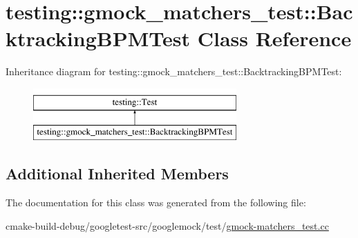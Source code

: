 \hypertarget{classtesting_1_1gmock__matchers__test_1_1BacktrackingBPMTest}{}\section{testing\+::gmock\+\_\+matchers\+\_\+test\+::Backtracking\+B\+P\+M\+Test Class Reference}
\label{classtesting_1_1gmock__matchers__test_1_1BacktrackingBPMTest}
Inheritance diagram for testing\+::gmock\+\_\+matchers\+\_\+test\+::Backtracking\+B\+P\+M\+Test\+:\begin{figure}[H]
\begin{center}
\leavevmode
\includegraphics[height=2.000000cm]{classtesting_1_1gmock__matchers__test_1_1BacktrackingBPMTest}
\end{center}
\end{figure}
\subsection*{Additional Inherited Members}


The documentation for this class was generated from the following file\+:\begin{DoxyCompactItemize}
\item 
cmake-\/build-\/debug/googletest-\/src/googlemock/test/\mbox{\hyperlink{gmock-matchers__test_8cc}{gmock-\/matchers\+\_\+test.\+cc}}\end{DoxyCompactItemize}
